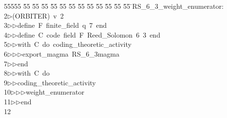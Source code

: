 %
%
\begin{tabbing}
55555 \= 55 \= 55 \= 55 \= 55 \= 55 \= 55 \= 55 \= 55 \= 55 \= 55 \= 55 \= 55 \= \>RS\_6\_3\_weight\_enumerator:\\[0pt]
2\>$\triangleright$\>(ORBITER)\ v\ 2\ \\[0pt]
3\>$\triangleright$\>$\triangleright$\>define\ F\ finite\_field\ q\ 7\ end\ \\[0pt]
4\>$\triangleright$\>$\triangleright$\>define\ C\ code\ field\ F\ Reed\_Solomon\ 6\ 3\ end\ \\[0pt]
5\>$\triangleright$\>$\triangleright$\>with\ C\ do\ coding\_theoretic\_activity\ \\[0pt]
6\>$\triangleright$\>$\triangleright$\>$\triangleright$\>export\_magma\ RS\_6\_3magma\ \\[0pt]
7\>$\triangleright$\>$\triangleright$\>end\ \\[0pt]
8\>$\triangleright$\>$\triangleright$\>with\ C\ do\ \\[0pt]
9\>$\triangleright$\>$\triangleright$\>coding\_theoretic\_activity\ \\[0pt]
10\>$\triangleright$\>$\triangleright$\>$\triangleright$\>weight\_enumerator\ \\[0pt]
11\>$\triangleright$\>$\triangleright$\>end\\[0pt]
12\>\end{tabbing}
